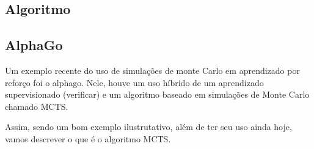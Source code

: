 \documentclass{article}
\begin{document}
        \subsection{Algoritmo}
        
        \subsection{AlphaGo}
        
            Um exemplo recente do uso de simulações de monte Carlo em aprendizado por reforço foi o alphago. Nele, houve um uso híbrido de um aprendizado supervisionado (verificar) e um algoritmo baseado em simulações de Monte Carlo chamado MCTS.

            Assim, sendo um bom exemplo ilustrutativo, além de ter seu uso ainda hoje, vamos descrever o que é o algoritmo MCTS.
\end{document}
